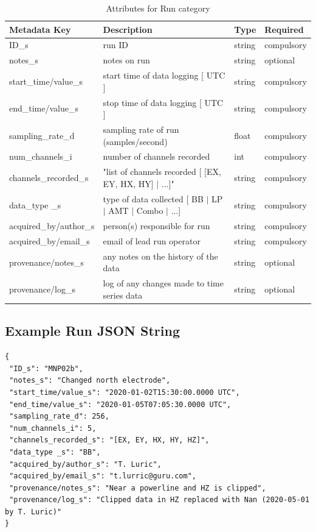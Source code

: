 \documentclass{article}
\begin{document}
\begin{table}[htb!]
	\caption[Attributes for Run]{Attributes for Run category}
	\begin{tabular}{|l|p{3in}|l|l|}
		\hline
		\textbf{Metadata Key} & \textbf{Description} & \textbf{Type} & \textbf{Required} \\ \hline
		ID\_s & run ID & string & compulsory \\ \hline
		notes\_s & notes on run & string & optional \\ \hline
		start\_time/value\_s & start time of data logging [ UTC ] & string & compulsory \\ \hline
		end\_time/value\_s & stop time of data logging [ UTC ] & string & compulsory \\ \hline
		sampling\_rate\_d & sampling rate of run (samples/second) & float & compulsory \\ \hline
		num\_channels\_i & number of channels recorded & int & compulsory \\ \hline
		channels\_recorded\_s & "list of channels recorded [ [EX, EY, HX, HY] $|$ ...]" & string & compulsory \\ \hline
		data\_type \_s & type of data collected [ BB $|$ LP $|$ AMT $|$ Combo $|$ ...] & string & compulsory \\ \hline
		acquired\_by/author\_s & person(s) responsible for run & string & compulsory \\ \hline
		acquired\_by/email\_s & email of lead run operator & string & compulsory \\ \hline
		provenance/notes\_s & any notes on the history of the data & string & optional \\ \hline
		provenance/log\_s & log of any changes made to time series data & string & optional \\ \hline
	\end{tabular}
	\label{tab:run}
\end{table}

\subsection{Example Run JSON String}

\begin{verbatim}
{
 "ID_s": "MNP02b",
 "notes_s": "Changed north electrode",
 "start_time/value_s": "2020-01-02T15:30:00.0000 UTC",
 "end_time/value_s": "2020-01-05T07:05:30.0000 UTC",
 "sampling_rate_d": 256,
 "num_channels_i": 5,
 "channels_recorded_s": "[EX, EY, HX, HY, HZ]",
 "data_type _s": "BB",
 "acquired_by/author_s": "T. Luric",
 "acquired_by/email_s": "t.lurric@guru.com",
 "provenance/notes_s": "Near a powerline and HZ is clipped",
 "provenance/log_s": "Clipped data in HZ replaced with Nan (2020-05-01 by T. Luric)"
}
\end{verbatim}
\end{document}
